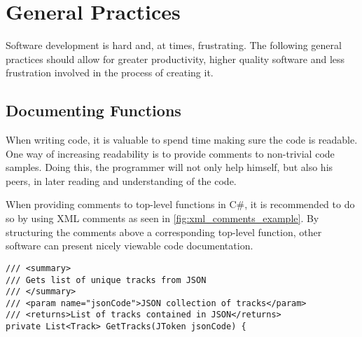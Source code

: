 \chapter{General Practices}
\label{imp:general_practices}

Software development is hard and, at times, frustrating. The following
general practices should allow for greater productivity, higher
quality software and less frustration involved in the process of creating it.

\section{Documenting Functions}
When writing code, it is valuable to spend time making sure the
code is readable. One way of increasing readability is to provide comments
to non-trivial code samples. Doing this, the programmer will not only
help himself, but also his peers, in later reading and understanding of the code.

When providing comments to top-level functions in C\#, it is
recommended to do so by using XML comments as seen in
\cref{fig:xml_comments_example}. By structuring the comments above a
corresponding top-level function, other software can present nicely
viewable code documentation.

\begin{lstlisting}[caption = {Example of XML-comments on top of C\# function.}, label={fig:xml_comments_example}]
/// <summary>
/// Gets list of unique tracks from JSON
/// </summary>
/// <param name="jsonCode">JSON collection of tracks</param>
/// <returns>List of tracks contained in JSON</returns>
private List<Track> GetTracks(JToken jsonCode) {
\end{lstlisting}
